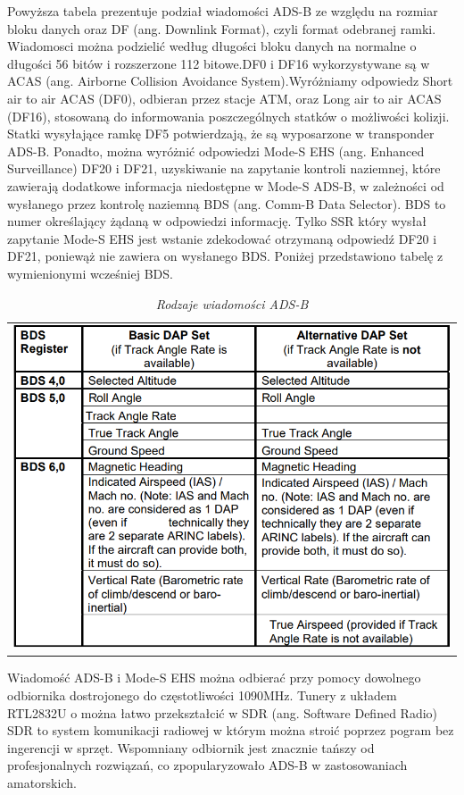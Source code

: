 \documentclass[eng,printmode]{mgr}
\begin{document}
Powyższa tabela prezentuje podział wiadomości ADS-B ze względu na rozmiar bloku danych oraz DF (ang. Downlink Format), czyli format odebranej ramki. Wiadomosci można podzielić według długości bloku danych na normalne o długości 56 bitów i rozszerzone 112 bitowe.DF0 i DF16 wykorzystywane są w ACAS (ang. Airborne Collision Avoidance System).Wyróżniamy odpowiedz Short air to air ACAS (DF0), odbieran przez stacje ATM, oraz Long air to air ACAS (DF16), stosowaną do informowania poszczególnych statków o możliwości kolizji. Statki wysyłające ramkę DF5 potwierdzają, że są wyposarzone w transponder ADS-B. Ponadto, można wyróżnić odpowiedzi Mode-S EHS (ang. Enhanced Surveillance) DF20 i DF21, uzyskiwanie na zapytanie kontroli naziemnej, które zawierają dodatkowe informacja niedostępne w Mode-S ADS-B, w zależności od wysłanego przez kontrolę naziemną BDS (ang. Comm-B Data Selector). BDS to numer określający żądaną w odpowiedzi informację. Tylko SSR który wysłał zapytanie Mode-S EHS jest wstanie zdekodować otrzymaną odpowiedź DF20 i DF21, poniewąż nie zawiera on wysłanego BDS. Poniżej przedstawiono tabelę z wymienionymi wcześniej BDS.

\begin{table}[ph]
\caption{\textit{ Rodzaje wiadomości ADS-B}}

  \centering
  \begin{tabular}{l}
  \\
    \includegraphics[width=\textwidth]{images/bds.png}
 \end{tabular}
\end{table}

Wiadomość ADS-B i Mode-S EHS można odbierać przy pomocy dowolnego odbiornika dostrojonego do częstotliwości 1090MHz. Tunery z układem RTL2832U o można łatwo przekształcić w SDR (ang. Software Defined Radio) SDR to system komunikacji radiowej w którym można stroić poprzez pogram bez ingerencji w sprzęt. Wspomniany odbiornik jest znacznie tańszy od profesjonalnych rozwiązań, co zpopularyzowało ADS-B w zastosowaniach amatorskich. 
\end{document}
